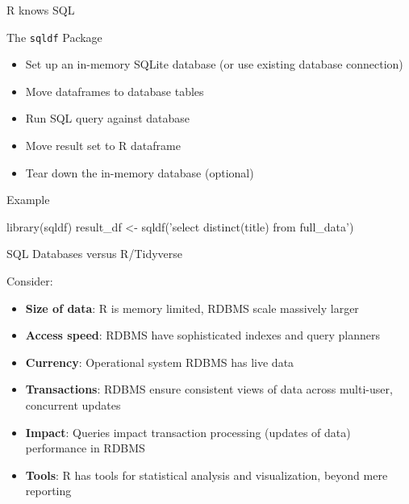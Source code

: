 \documentclass[ignorenonframetext,xcolor=x11names]{beamer}
\begin{document}
\begin{frame}[label=full,fragile]{R knows SQL}

\begin{block}{The \texttt{sqldf} Package}
  \begin{itemize}
     \item Set up an in-memory SQLite database (or use existing database connection)
     \item Move dataframes to database tables
     \item Run SQL query against database
     \item Move result set to R dataframe
     \item Tear down the in-memory database (optional)
  \end{itemize}
\end{block}

\begin{block}{Example}
\small
\begin{Rcode}
library(sqldf)
result_df <- 
   sqldf('select distinct(title) from full_data')
\end{Rcode}
\end{block}
\end{frame}


\begin{frame}[label=full]{SQL Databases versus R/Tidyverse}
\begin{block}{Consider:}
  \begin{itemize}
     \item \textbf{Size of data}: R is memory limited, RDBMS scale massively larger
     \item \textbf{Access speed}: RDBMS have sophisticated indexes and query planners
     \item \textbf{Currency}: Operational system RDBMS has live data
     \item \textbf{Transactions}: RDBMS ensure consistent views of data across multi-user, concurrent updates
     \item \textbf{Impact}: Queries impact transaction processing (updates of data) performance in RDBMS 
     \item \textbf{Tools}: R has tools for statistical analysis and visualization, beyond mere reporting
  \end{itemize}
\end{block}
\end{frame}
\end{document}

